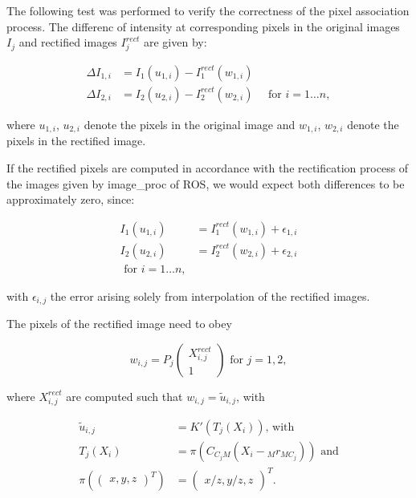 The following test was performed to verify the correctness of the pixel
association process. 
The differenc of intensity at corresponding pixels in the original images
$I_{j}$ and rectified images $I_{j}^{rect}$ are given by:

\begin{align}
  \Delta I_{1,i} &= I_1(u_{1,i}) - I_1^{rect}(w_{1,i}) \\
  \Delta I_{2,i} &= I_2(u_{2,i}) - I_2^{rect}(w_{2,i}) \hspace{1em}
  \text{   for } i = 1 \ldots n, 
  \label{eqn:rect/I_def}
\end{align}

where $u_{1,i}$, $u_{2,i}$ denote the pixels in the original image and
$w_{1,i}$, $w_{2,i}$ denote the pixels in the rectified image. 

If the rectified pixels are computed in accordance with the rectification
process of the images given by image\_proc of ROS, we would expect both 
differences to be approximately zero, since:

\begin{align}
  I_1(u_{1,i}) &= I_1^{rect}(w_{1,i}) + \epsilon_{1,i} \\
  I_2(u_{2,i}) &= I_2^{rect}(w_{2,i}) + \epsilon_{2,i} \\
  \text{   for } i = 1 \ldots n, 
  \label{eqn:rect/diffI_eq}
\end{align}

with $\epsilon_{i,j}$ the error arising solely from interpolation of the rectified
images.

The pixels of the rectified image need to obey

\begin{equation}
  w_{i,j} = P_j \begin{pmatrix} X_{i,j}^{rect} \\ 1 \end{pmatrix}
  \text{   for } j = 1, 2,
  \label{eqn:rect/w_def}
\end{equation}

where $X_{i,j}^{rect}$ are computed such that $w_{i,j} = \tilde{u}_{i,j}$, with

\begin{align}
  \tilde{u}_{i,j} &= K'(T_j(X_i)) \text{, with} \\
  T_j(X_i) &= \pi(C_{C_j M} (X_i - {_M}r_{MC_j})) \text{   and} \\
  \pi(\begin{pmatrix} x, y, z \end{pmatrix}^T) &= 
  \begin{pmatrix} x/z, y/z, z \end{pmatrix}^T.
  \label{eqn:rect/utilde_def}
\end{align}

